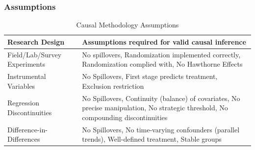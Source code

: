 \documentclass[xcolor=x11names,compress]{beamer}\usepackage[]{graphicx}\usepackage[]{xcolor}
\renewcommand{\(}{\begin{columns}}
\renewcommand{\)}{\end{columns}}
\newcommand{\<}[1]{\begin{column}{#1}}
\renewcommand{\>}{\end{column}}
\begin{document}
\begin{frame}
\frametitle{Assumptions}
\footnotesize
\begin{table}[htbp]
  \centering
  \caption{Causal Methodology Assumptions}
    \begin{tabular}{|p{3cm}|p{6cm}|}
    \hline
    \textbf{Research Design} & \textbf{Assumptions required for valid causal inference} \bigstrut\\
    \hline
    Field/Lab/Survey Experiments & No spillovers, Randomization implemented correctly, Randomization complied with, No Hawthorne Effects \bigstrut\\
    \hline
    Instrumental Variables & No Spillovers, First stage predicts treatment, Exclusion restriction \bigstrut\\
    \hline
    Regression Discontinuities & No Spillovers, Continuity (balance) of covariates, No precise manipulation, No strategic threshold, No compounding discontinuities \bigstrut\\
    \hline
    Difference-in-Differences & No Spillovers, No time-varying confounders (parallel trends), Well-defined treatment, Stable groups \bigstrut\\
    \hline
    \end{tabular}%
  \label{tab:addlabel}%
\end{table}%
\normalsize
\end{frame}

  
\end{document}
